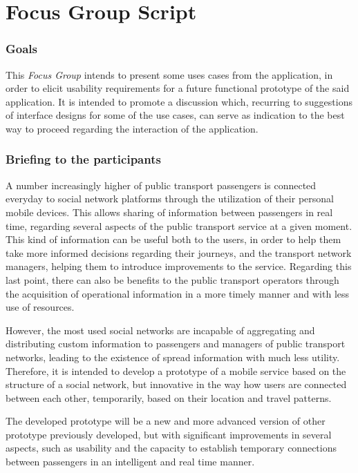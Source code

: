 \chapter{Focus Group Script} \label{ap1:focgr}

\subsection{Goals}

This \emph{Focus Group} intends to present some uses cases from the application, in order to elicit usability requirements for a future functional prototype of the said application.
It is intended to promote a discussion which, recurring to suggestions of interface designs for some of the use cases, can serve as indication to the best way to proceed regarding the interaction of the application.

\subsection{Briefing to the participants}

A number increasingly higher of public transport passengers is connected everyday to social network platforms through the utilization of their personal mobile devices. This allows sharing of information between passengers in real time, regarding several aspects of the public transport service at a given moment.
This kind of information can be useful both to the users, in order to help them take more informed decisions regarding their journeys, and the transport network managers, helping them to introduce improvements to the service.
Regarding this last point, there can also be benefits to the public transport operators through the acquisition of operational information in a more timely manner and with less use of resources.

However, the most used social networks are incapable of aggregating and distributing custom information to passengers and managers of public transport networks, leading to the existence of spread information with much less utility. Therefore, it is intended to develop a prototype of a mobile service based on the structure of a social network, but innovative in the way how users are connected between each other, temporarily, based on their location and travel patterns. 

The developed prototype will be a new and more advanced version of other prototype previously developed, but with significant improvements in several aspects, such as usability and the capacity to establish temporary connections between passengers in an intelligent and real time manner.

